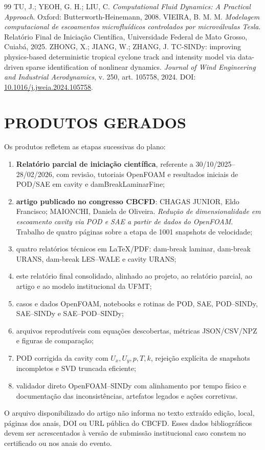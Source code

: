 \documentclass[12pt,a4paper]{article}
\newcommand{\novasecao}[1]{\clearpage\section{#1}}
\begin{document}
\begin{thebibliography}{99}
 TU, J.; YEOH, G. H.; LIU, C. \textit{Computational Fluid Dynamics: A Practical Approach}. Oxford: Butterworth-Heinemann, 2008.
 VIEIRA, B. M. M. \textit{Modelagem computacional de escoamentos microfluídicos controlados por microválvulas Tesla}. Relatório Final de Iniciação Científica, Universidade Federal de Mato Grosso, Cuiabá, 2025.
 ZHONG, X.; JIANG, W.; ZHANG, J. TC-SINDy: improving physics-based deterministic tropical cyclone track and intensity model via data-driven sparse identification of nonlinear dynamics. \textit{Journal of Wind Engineering and Industrial Aerodynamics}, v. 250, art. 105758, 2024. DOI: \href{https://doi.org/10.1016/j.jweia.2024.105758}{10.1016/j.jweia.2024.105758}.
\end{thebibliography}

\novasecao{PRODUTOS GERADOS}
Os produtos refletem as etapas sucessivas do plano:
\begin{enumerate}
\item \textbf{Relatório parcial de iniciação científica}, referente a 30/10/2025--28/02/2026, com revisão, tutoriais OpenFOAM e resultados iniciais de POD/SAE em cavity e damBreakLaminarFine;
\item \textbf{artigo publicado no congresso CBCFD}: CHAGAS JUNIOR, Eldo Francisco; MAIONCHI, Daniela de Oliveira. \textit{Redução de dimensionalidade em escoamento cavity via POD e SAE a partir de dados do OpenFOAM}. Trabalho de quatro páginas sobre a etapa de 1001 snapshots de velocidade;
\item quatro relatórios técnicos em LaTeX/PDF: dam-break laminar, dam-break URANS, dam-break LES--WALE e cavity URANS;
\item este relatório final consolidado, alinhado ao projeto, ao relatório parcial, ao artigo e ao modelo institucional da UFMT;
\item casos e dados OpenFOAM, notebooks e rotinas de POD, SAE, POD--SINDy, SAE--SINDy e SAE--POD--SINDy;
\item arquivos reprodutíveis com equações descobertas, métricas JSON/CSV/NPZ e figuras de comparação;
\item POD corrigida da cavity com $U_x,U_y,p,T,k$, rejeição explícita de snapshots incompletos e SVD truncada eficiente;
\item validador direto OpenFOAM--SINDy com alinhamento por tempo físico e documentação das inconsistências, artefatos legados e ações corretivas.
\end{enumerate}

\noindent O arquivo disponibilizado do artigo não informa no texto extraído edição, local, páginas dos anais, DOI ou URL pública do CBCFD. Esses dados bibliográficos devem ser acrescentados à versão de submissão institucional caso constem no certificado ou nos anais do evento.
\end{document}

